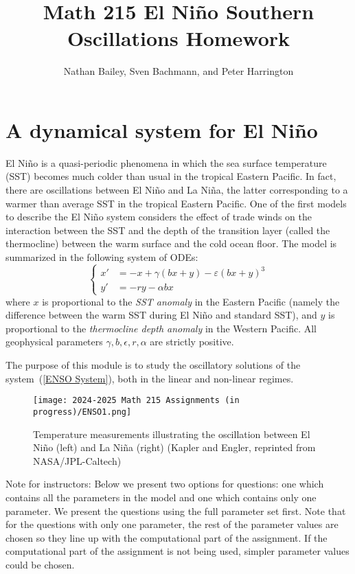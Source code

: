 \documentclass[10pt, letterpaper, answer]{exam}
\title{Math 215 El Ni\~no Southern Oscillations Homework}
\author{Nathan Bailey, Sven Bachmann, and Peter Harrington}
\date{}
\begin{document}
\maketitle
\section{A dynamical system for El Ni\~no}

El Ni\~no is a quasi-periodic phenomena in which the sea surface temperature (SST) becomes much colder than usual in the tropical Eastern Pacific. In fact, there are oscillations between El Ni\~no and La Ni\~na, the latter corresponding to a warmer than average SST  in the tropical Eastern Pacific. One of the first models to describe the El Ni\~no system considers the effect of trade winds on the interaction between the SST and the depth of the transition layer (called the thermocline) between the warm surface and the cold ocean floor. The model is summarized in the following system of ODEs:
\begin{equation}\label{ENSO System}
\begin{cases}
    x' & = -x + \gamma (bx + y) - \varepsilon (bx + y)^3 \\
    y' & = -ry - \alpha  b x
\end{cases}   
\end{equation}
where $x$ is proportional to the \emph{SST anomaly} in the Eastern Pacific (namely the difference between the warm SST during El Ni\~no and standard SST), and $y$ is  proportional to the \emph{thermocline depth anomaly} in the Western Pacific. All geophysical parameters $\gamma,b,\epsilon,r,\alpha$ are strictly positive.

The purpose of this module is to study the oscillatory solutions of the system~(\ref{ENSO System}), both in the linear and non-linear regimes. 

\begin{figure}[h]
    \centering
    \texttt{[image: 2024-2025 Math 215 Assignments (in progress)/ENSO1.png]}
    \caption{Temperature measurements illustrating the oscillation between El Ni\~no (left) and La Ni\~na (right) (Kapler and Engler, reprinted from NASA/JPL-Caltech)}
    \label{fig:enter-label}
\end{figure}


Note for instructors: Below we present two options for questions: one which contains all the parameters in the model and one which contains only one parameter. We present the questions using the full parameter set first. Note that for the questions with only one parameter, the rest of the parameter values are chosen so they line up with the computational part of the assignment. If the computational part of the assignment is not being used, simpler parameter values could be chosen.
\end{document}
